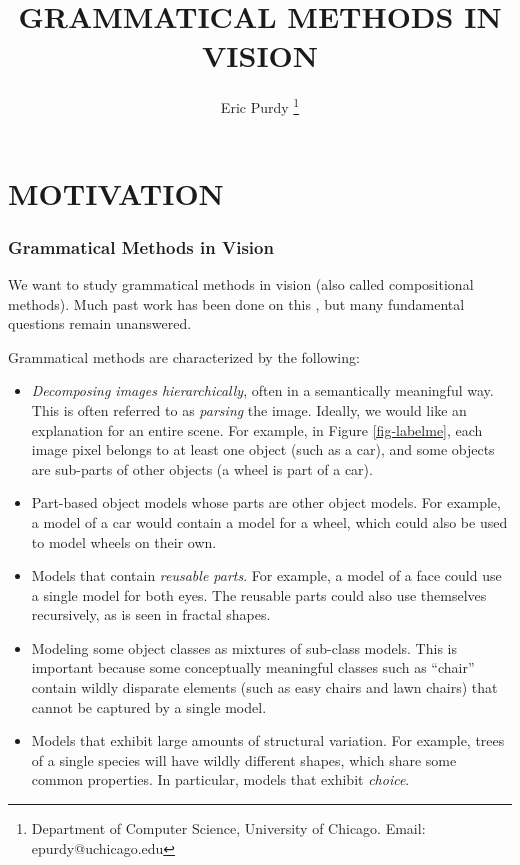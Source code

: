 \documentclass{article}
\title{GRAMMATICAL METHODS IN VISION}
\author{Eric Purdy \footnote{Department of Computer Science,
    University of Chicago. Email: epurdy@uchicago.edu}}
\begin{document}
\maketitle

\tableofcontents

\part{MOTIVATION}

\section{Grammatical Methods in Vision}

We want to study grammatical methods in vision (also called
compositional methods). Much past work has been done on this
\cite{pop, potter-geman-bienenstock, ks-fu, potter-geman-chi, 
  grenander, zhu-han, jin-geman, potter, zhu-tu-chen-yuille,
  zhu-chen-yuille, zhu-mumford}, but many fundamental questions remain
unanswered.

Grammatical methods are characterized by the following:
\begin{itemize}
\item \emph{Decomposing images hierarchically}, often in a semantically
  meaningful way. This is often referred to as \emph{parsing} the
  image. Ideally, we would like an explanation for an entire
  scene. For example, in Figure \ref{fig-labelme}, each image pixel
  belongs to at least one object (such as a car), and some objects are
  sub-parts of other objects (a wheel is part of a car).
\item Part-based object models whose parts are other object
  models. For example, a model of a car would contain a model for a
  wheel, which could also be used to model wheels on their own.
\item Models that contain \emph{reusable parts}. For example, a model of a
  face could use a single model for both eyes. The reusable parts
  could also use themselves recursively, as is seen in fractal shapes.
\item Modeling some object classes as mixtures of sub-class
  models. This is important because some conceptually meaningful
  classes such as ``chair'' contain wildly disparate elements (such as
  easy chairs and lawn chairs) that cannot be captured by a single
  model.
\item Models that exhibit large amounts of structural variation. For
  example, trees of a single species will have wildly different
  shapes, which share some common properties. In particular, models
  that exhibit \emph{choice}.
\end{itemize}
\end{document}
